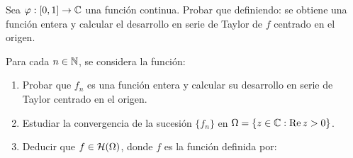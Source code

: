 \begin{ejercicio}
    Sea $\varphi : [0,1]\to\mathbb{C}$ una función continua. Probar que definiendo:
    se obtiene una función entera y calcular el desarrollo en serie de Taylor de $f$ centrado en el origen.
\end{ejercicio}

\begin{ejercicio}
    Para cada $n\in\mathbb{N}$, se considera la función:
    \begin{enumerate}
        \item Probar que $f_n$ es una función entera y calcular su desarrollo en serie de Taylor centrado en el origen.
        \item Estudiar la convergencia de la sucesión $\{f_n\}$ en $\Omega = \{z\in\mathbb{C} : \operatorname{Re} z > 0\}$.
        \item Deducir que $f\in \mathcal{H}(\Omega)$, donde $f$ es la función definida por:
    \end{enumerate}
\end{ejercicio}
